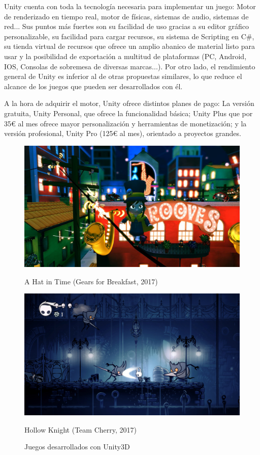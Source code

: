 Unity cuenta con toda la tecnología necesaria para implementar un juego: Motor de renderizado en tiempo real, motor de físicas, sistemas de audio, sistemas de red... Sus puntos más fuertes son su facilidad de uso gracias a su editor gráfico personalizable, su facilidad para cargar recursos, su sistema de Scripting en C\#, su tienda virtual de recursos que ofrece un amplio abanico de material listo para usar y la posibilidad de exportación a multitud de plataformas (PC, Android, IOS, Consolas de sobremesa de diversas marcas...). Por otro lado, el rendimiento general de Unity es inferior al de otras propuestas similares, lo que reduce el alcance de los juegos que pueden ser desarrollados con él.

A la hora de adquirir el motor, Unity ofrece distintos planes de pago: La versión gratuita, Unity Personal, que ofrece la funcionalidad básica; Unity Plus que por 35€ al mes ofrece mayor personalización y herramientas de monetización; y la versión profesional, Unity Pro (125€ al mes), orientado a proyectos grandes.
\begin{figure}[!htb]
   \begin{minipage}{0.50\textwidth}
     \centering
     \includegraphics[width=0.9\linewidth, left]{images/estadodelarte/motores/hat-in-time}
     \caption{A Hat in Time (Gears for Breakfast, 2017)}
   \end{minipage}\hfill
   \begin {minipage}{0.50\textwidth}
     \centering
     \includegraphics[width=0.9\linewidth, right]{images/estadodelarte/motores/hollow-knight}
     \caption{Hollow Knight (Team Cherry, 2017)}
   \end{minipage}
   \caption{Juegos desarrollados con Unity3D}
\end{figure}

